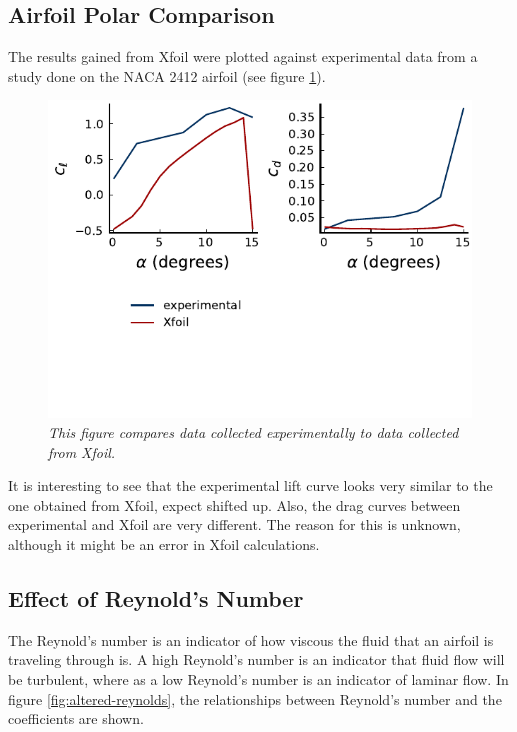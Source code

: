 \documentclass{journal}
\begin{document}
	\subsection{Airfoil Polar Comparison}
	The results gained from Xfoil were plotted against experimental data from a study done on the NACA 2412 airfoil (see figure \ref{fig:airfoil-comparison}).\\
	
	\begin{figure}[H]
		\centering
		\includegraphics{../graphics/airfoil-compare.pdf}
		\caption{\emph{This figure compares data collected experimentally to data collected from Xfoil.}}
		\label{fig:airfoil-comparison}
	\end{figure}
	
	It is interesting to see that the experimental lift curve looks very similar to the one obtained from Xfoil, expect shifted up. Also, the drag curves between experimental and Xfoil are very different. The reason for this is unknown, although it might be an error in Xfoil calculations.\\
	
	\subsection{Effect of Reynold's Number}
	The Reynold's number is an indicator of how viscous the fluid that an airfoil is traveling through is. A high Reynold's number is an indicator that fluid flow will be turbulent, where as a low Reynold's number is an indicator of laminar flow. In figure \ref{fig:altered-reynolds}, the relationships between Reynold's number and the coefficients are shown.\\
	
\end{document}
